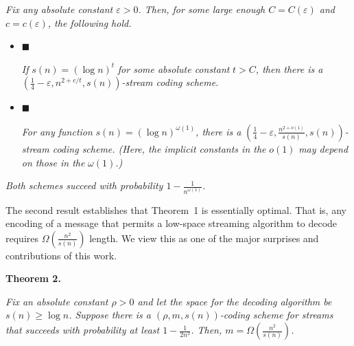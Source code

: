 \emph{Fix any absolute constant $\varepsilon>0$. Then, for some large enough
$C=C(\varepsilon)$ and $c=c(\varepsilon)$, the following hold.}\par


\begin{itemize}


\item[] 
$\blacksquare$ 


\emph{If }$s(n)=(\log n)^{t}$\emph{ for some absolute constant }$t>C$\emph{, then there is a }$\left(\frac{1}{4}-\varepsilon,n^{2+c/t},s(n)\right)$\emph{-stream coding scheme.}\par





\item[] 
$\blacksquare$ 


\emph{For any function }$s(n)=(\log n)^{\omega(1)}$\emph{, there is a }$\left(\frac{1}{4}-\varepsilon,\frac{n^{2+o(1)}}{s(n)},s(n)\right)$\emph{-stream coding scheme. (Here, the implicit constants in the }$o(1)$\emph{ may depend on those in the }$\omega(1)$\emph{.)}\par





\end{itemize}


\emph{Both schemes succeed with probability $1-\frac{1}{n^{\omega(1)}}$.}\par






The second result establishes that Theorem 1 is essentially optimal. That is, any encoding of a message that permits a low-space streaming algorithm to decode requires $\Omega\left(\frac{n^{2}}{s(n)}\right)$ length. We view this as one of the major surprises and contributions of this work.\par





\par\medskip\noindent\textbf{
\textbf{Theorem 2}\textbf{.}
}\par



\emph{Fix an absolute constant $\rho>0$ and let the space for the decoding algorithm be $s(n)\geq\log n$. Suppose there is a $\left(\rho,m,s(n)\right)$-coding scheme for streams that succeeds with probability at least $1-\frac{1}{2n^{2}}$. Then, $m=\Omega\left(\frac{n^{2}}{s(n)}\right)$.}\par



